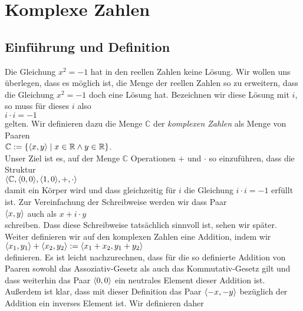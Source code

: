 \chapter{Komplexe Zahlen}

\section{Einführung und Definition}
Die Gleichung $x^2 = -1$ hat in den reellen Zahlen keine Lösung.  Wir wollen uns überlegen,
dass es möglich ist, die Menge der reellen Zahlen so zu erweitern, dass die
Gleichung $x^2 = -1$ doch eine Lösung hat.  Bezeichnen wir diese Lösung mit $i$, so muss
für dieses $i$ also
\\[0.2cm]
\hspace*{1.3cm}
$i \cdot i = -1$
\\[0.2cm]
gelten.  Wir definieren dazu die Menge $\mathbb{C}$ der \emph{komplexen Zahlen} als Menge
von Paaren
\\[0.2cm]
\hspace*{1.3cm}
$\mathbb{C} := \{ \pair(x,y) \mid x \in \mathbb{R} \wedge y \in \mathbb{R} \}$.
\\[0.2cm]
Unser Ziel ist es, auf der Menge $\mathbb{C}$ Operationen $+$ und $\cdot$ so einzuführen, dass
die Struktur
\\[0.2cm]
\hspace*{1.3cm}
$\langle \mathbb{C}, \pair(0,0), \pair(1,0), +, \cdot \rangle$
\\[0.2cm]
damit ein Körper wird und dass gleichzeitig für $i$ die Gleichung $i \cdot i = -1$ erfüllt
ist.  Zur Vereinfachung der Schreibweise werden wir dass Paar 
\\[0.2cm]
\hspace*{1.3cm}
$\pair(x,y)$ \quad auch als \quad $x + i \cdot y$
\\[0.2cm]
schreiben.  Dass diese Schreibweise tatsächlich sinnvoll ist, sehen wir später.
Weiter definieren wir auf den komplexen Zahlen eine Addition, indem wir 
\\[0.2cm]
\hspace*{1.3cm}
$\pair(x_1,y_1) + \pair(x_2, y_2) := \pair(x_1 + x_2, y_1 + y_2)$
\\[0.2cm]
definieren.  Es ist leicht nachzurechnen, dass für die so definierte Addition von Paaren
sowohl das Assoziativ-Gesetz als auch das Kommutativ-Gesetz gilt und dass weiterhin das
Paar $\pair(0,0)$ ein neutrales Element 
dieser Addition ist.  Außerdem ist klar, dass mit dieser Definition das Paar
$\pair(-x,-y)$ bezüglich der Addition ein inverses Element ist.  Wir definieren daher
